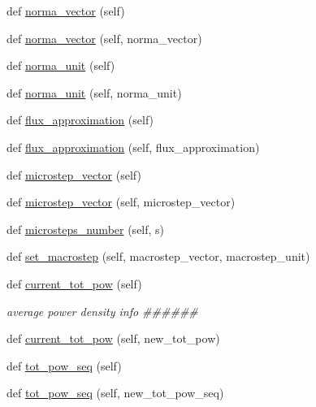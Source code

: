 \begin{DoxyCompactItemize}
\item 
def \hyperlink{classonix_1_1sequence_1_1Sequence_a7c65d81c5dd1265034ba6c19c3aa6760}{norma\+\_\+vector} (self)
\item 
def \hyperlink{classonix_1_1sequence_1_1Sequence_a19e647f8872e99c45940874da5d2ec58}{norma\+\_\+vector} (self, norma\+\_\+vector)
\item 
def \hyperlink{classonix_1_1sequence_1_1Sequence_a180c5c6bfafa1bceabce0c8365fb36f0}{norma\+\_\+unit} (self)
\item 
def \hyperlink{classonix_1_1sequence_1_1Sequence_ab1965b8fda8d2c9fbc69fd075825380f}{norma\+\_\+unit} (self, norma\+\_\+unit)
\item 
def \hyperlink{classonix_1_1sequence_1_1Sequence_a540435e404fb702638ef020d1f5d79eb}{flux\+\_\+approximation} (self)
\item 
def \hyperlink{classonix_1_1sequence_1_1Sequence_a0705ea21972d5d28041c449f678b93ae}{flux\+\_\+approximation} (self, flux\+\_\+approximation)
\item 
def \hyperlink{classonix_1_1sequence_1_1Sequence_a462b334d5ffd3b393ed52f0c34afa97c}{microstep\+\_\+vector} (self)
\item 
def \hyperlink{classonix_1_1sequence_1_1Sequence_a1750acb3c5ce8469efc1c149787b1eff}{microstep\+\_\+vector} (self, microstep\+\_\+vector)
\item 
def \hyperlink{classonix_1_1sequence_1_1Sequence_a187bb8caa6ec692cb6302ef39020e462}{microsteps\+\_\+number} (self, s)
\item 
def \hyperlink{classonix_1_1sequence_1_1Sequence_ac5a703466edd1b937689ed12ac3c624d}{set\+\_\+macrostep} (self, macrostep\+\_\+vector, macrostep\+\_\+unit)
\item 
def \hyperlink{classonix_1_1sequence_1_1Sequence_a8ad2f8fc75d5951798c64bfd8924b7c0}{current\+\_\+tot\+\_\+pow} (self)
\begin{DoxyCompactList}\small\item\em average power density info \#\#\#\#\#\# \end{DoxyCompactList}\item 
def \hyperlink{classonix_1_1sequence_1_1Sequence_a1a280133e5dae74875a5d1e80f923c10}{current\+\_\+tot\+\_\+pow} (self, new\+\_\+tot\+\_\+pow)
\item 
def \hyperlink{classonix_1_1sequence_1_1Sequence_a486a4d2cae250caed5c2ca84adb09c74}{tot\+\_\+pow\+\_\+seq} (self)
\item 
def \hyperlink{classonix_1_1sequence_1_1Sequence_a7e4da78acea29975929ca4dbded27daa}{tot\+\_\+pow\+\_\+seq} (self, new\+\_\+tot\+\_\+pow\+\_\+seq)

\end{DoxyCompactItemize}
